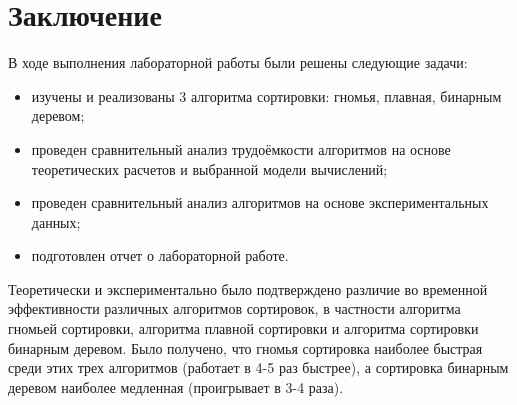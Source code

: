 \chapter*{Заключение}

В ходе выполнения лабораторной работы были решены следующие задачи:

\begin{itemize}
	\item изучены и реализованы 3 алгоритма сортировки: гномья, плавная, бинарным деревом;
	\item проведен сравнительный анализ трудоёмкости алгоритмов на основе теоретических расчетов и выбранной модели вычислений;
	\item проведен сравнительный анализ алгоритмов на основе экспериментальных данных;
	\item подготовлен отчет о лабораторной работе.
\end{itemize}

Теоретически и экспериментально было подтверждено различие во временной эффективности различных алгоритмов сортировок, в частности алгоритма гномьей сортировки, алгоритма плавной сортировки и алгоритма сортировки бинарным деревом.  Было получено, что гномья сортировка наиболее быстрая среди этих трех алгоритмов (работает в 4-5 раз быстрее), а сортировка бинарным деревом наиболее медленная (проигрывает в 3-4 раза).

